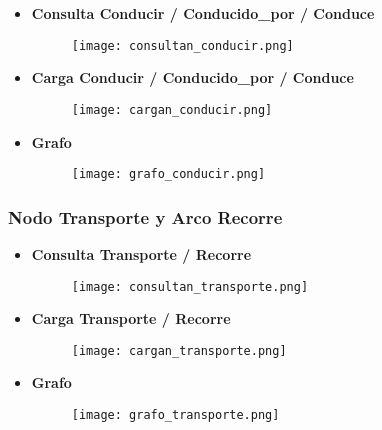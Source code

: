 \documentclass[a4paper]{article}
\begin{document}
\begin{itemize}

    \item \textbf{\large{Consulta Conducir / Conducido\_por / Conduce}}

    \begin{figure}[H]
        \centering
        \texttt{[image: consultan\_conducir.png]}
        \label{fig:consultan_conducir}
    \end{figure}

    \item \textbf{\large{Carga Conducir / Conducido\_por / Conduce}}

    \begin{figure}[H]
        \centering
        \texttt{[image: cargan\_conducir.png]}
        \label{fig:cargan_conducir}
    \end{figure}

\newpage

    \item \textbf{\large{Grafo}}

    \begin{figure}[H]
        \centering
        \texttt{[image: grafo\_conducir.png]}
        \label{fig:grafo_conducir}
    \end{figure}

\end{itemize}

\subsubsection{\Large{Nodo Transporte y Arco Recorre}}

\begin{itemize}

    \item \textbf{\large{Consulta Transporte / Recorre}}

    \begin{figure}[H]
        \centering
        \texttt{[image: consultan\_transporte.png]}
        \label{fig:consultan_transporte}
    \end{figure}

    \item \textbf{\large{Carga Transporte / Recorre}}

    \begin{figure}[H]
        \centering
        \texttt{[image: cargan\_transporte.png]}
        \label{fig:cargan_transporte}
    \end{figure}

\newpage

    \item \textbf{\large{Grafo}}

    \begin{figure}[H]
        \centering
        \texttt{[image: grafo\_transporte.png]}
        \label{fig:grafo_transporte}
    \end{figure}

\end{itemize}
\end{document}
